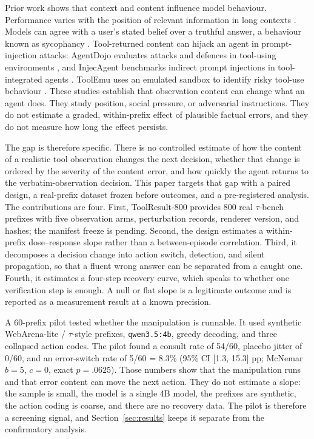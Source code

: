 \documentclass[a4paper,fleqn]{cas-sc}
\begin{document}
Prior work shows that context and content influence model behaviour. Performance varies with the
position of relevant information in long contexts \cite{lostmiddle}. Models can agree with a
user's stated belief over a truthful answer, a behaviour known as sycophancy \cite{sycophancy}.
Tool-returned content can hijack an agent in prompt-injection attacks: AgentDojo evaluates
attacks and defences in tool-using environments \cite{agentdojo}, and InjecAgent benchmarks
indirect prompt injections in tool-integrated agents \cite{injecagent}. ToolEmu uses an emulated
sandbox to identify risky tool-use behaviour \cite{toolemu}. These studies establish that
observation content can change what an agent does. They study position, social pressure, or
adversarial instructions. They do not estimate a graded, within-prefix effect of plausible
factual errors, and they do not measure how long the effect persists.

The gap is therefore specific. There is no controlled estimate of how the content of a realistic
tool observation changes the next decision, whether that change is ordered by the severity of the
content error, and how quickly the agent returns to the verbatim-observation decision. This
paper targets that gap with a paired design, a real-prefix dataset frozen before outcomes, and a
pre-registered analysis. The contributions are four. First, ToolResult-800 provides 800 real $\tau$-bench
prefixes with five observation arms, perturbation records, renderer version, and hashes; the
manifest freeze is pending. Second, the design estimates a within-prefix dose--response slope
rather than a between-episode
correlation. Third, it decomposes a decision change into action switch, detection, and silent
propagation, so that a fluent wrong answer can be separated from a caught one. Fourth, it
estimates a four-step recovery curve, which speaks to whether one verification step is enough. A
null or flat slope is a legitimate outcome and is reported as a measurement result at a known
precision.

A 60-prefix pilot tested whether the manipulation is runnable. It used synthetic WebArena-lite /
$\tau$-style prefixes, \texttt{qwen3.5:4b}, greedy decoding, and three collapsed action codes. The
pilot found a consult rate of 54/60, placebo jitter of 0/60, and an error-switch rate of
5/60 = 8.3\% (95\% CI [1.3, 15.3] pp; McNemar $b=5$, $c=0$, exact $p=.0625$). Those numbers show
that the manipulation runs and that error content can move the next action. They do not estimate
a slope: the sample is small, the model is a single 4B model, the prefixes are synthetic, the
action coding is coarse, and there are no recovery data. The pilot is therefore a screening
signal, and Section~\ref{sec:results} keeps it separate from the confirmatory analysis.
\end{document}
